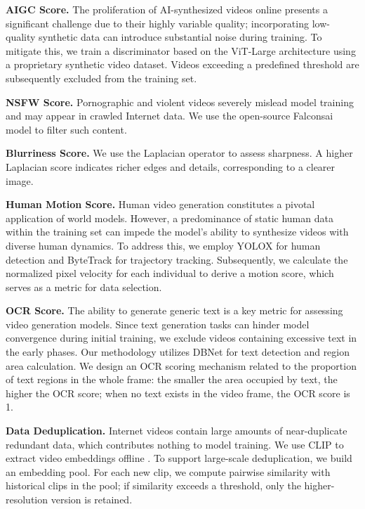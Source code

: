 \textbf{AIGC Score.} The proliferation of AI-synthesized videos online presents a significant challenge due to their highly variable quality; incorporating low-quality synthetic data can introduce substantial noise during training. To mitigate this, we train a discriminator based on the ViT-Large architecture using a proprietary synthetic video dataset. Videos exceeding a predefined threshold are subsequently excluded from the training set.

\textbf{NSFW Score.} Pornographic and violent videos severely mislead model training and may appear in crawled Internet data. We use the open-source Falconsai model \cite{Falconsai2023nsfw} to filter such content. 

\textbf{Blurriness Score.} We use the Laplacian operator to assess sharpness. A higher Laplacian score indicates richer edges and details, corresponding to a clearer image.

\textbf{Human Motion Score.} Human video generation constitutes a pivotal application of world models. However, a predominance of static human data within the training set can impede the model's ability to synthesize videos with diverse human dynamics. To address this, we employ YOLOX \cite{ge2021yolox} for human detection and ByteTrack \cite{zhang2021bytetrack} for trajectory tracking. Subsequently, we calculate the normalized pixel velocity for each individual to derive a motion score, which serves as a metric for data selection.

\textbf{OCR Score.} The ability to generate generic text is a key metric for assessing video generation models. Since text generation tasks can hinder model convergence during initial training, we exclude videos containing excessive text in the early phases. Our methodology utilizes DBNet \cite{liao2019real} for text detection and region area calculation. We design an OCR scoring mechanism related to the proportion of text regions in the whole frame: the smaller the area occupied by text, the higher the OCR score; when no text exists in the video frame, the OCR score is 1.


\textbf{Data Deduplication.} Internet videos contain large amounts of near-duplicate redundant data, which contributes nothing to model training. We use CLIP to extract video embeddings offline . To support large-scale deduplication, we build an embedding pool. For each new clip, we compute pairwise similarity with historical clips in the pool; if similarity exceeds a threshold, only the higher-resolution version is retained.


